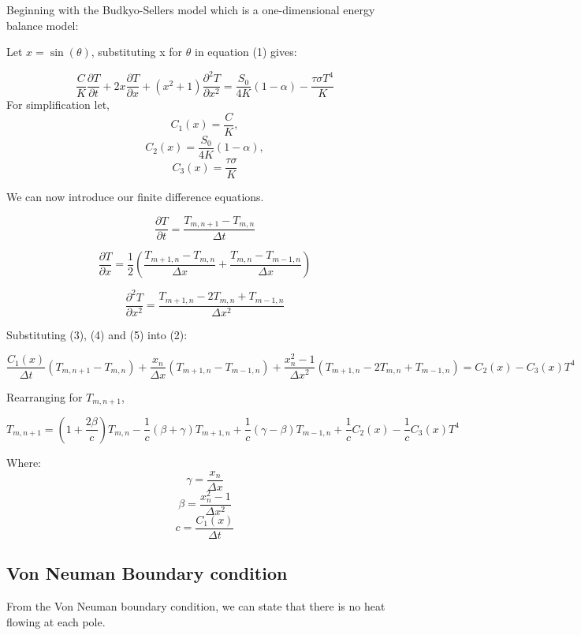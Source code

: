 \documentclass{article}%
\begin{document}
Beginning with the Budkyo-Sellers model which is a one-dimensional energy balance model:

Let $ x = \sin(\theta)$, substituting x for $\theta$ in equation (1) gives:

\begin{equation}
  \frac{C}{K} \frac{\partial T}{\partial t} + 2x \frac{\partial T}{\partial x} + (x^2 + 1)\frac{\partial^2 T}{\partial x^2} = \frac{S_{0}}{4K}(1 - \alpha) - \frac{\tau \sigma T^4}{K} 
\end{equation}
For simplification let, 
$$
  C_{1}(x) = \frac{C}{K},
$$
$$
  C_{2}(x) = \frac{S_{0}}{4K}(1 - \alpha),
$$
$$
  C_{3}(x) = \frac{\tau \sigma}{K}  
$$

We can now introduce our finite difference equations. 

\begin{equation}
  \frac{\partial T}{\partial t} = \frac{T_{m, n +1} - T_{m, n}}{\Delta t}
\end{equation}

\begin{equation}
  \frac{\partial T}{\partial x} = \frac{1}{2}( \frac{T_{m+1, n} - T_{m,n}}{\Delta x} + \frac{T_{m, n} - T_{m-1, n}}{\Delta x})
\end{equation}

\begin{equation}
  \frac{\partial^2 T}{\partial x^2} = \frac{T_{m+1, n} - 2T_{m,n} + T_{m-1, n}}{\Delta x^2}
\end{equation}

Substituting (3), (4) and (5) into (2):

$$
  \frac{C_{1}(x)}{\Delta t}  (T_{m, n +1} - T_{m, n}) + \frac{x_{n}}{\Delta x}(T_{m+1, n} - T_{m-1, n}) + \frac{x_{n}^{2} - 1}{\Delta x^2}(T_{m+1, n} - 2T_{m,n} + T_{m-1, n}) = C_{2}(x) - C_{3}(x) T^4
$$

Rearranging for $T_{m,n+1}$,

\begin{equation}
  T_{m, n +1} =  (1 + \frac{2\beta}{c})T_{m, n} - \frac{1}{c}({\beta + \gamma})T_{m+1, n} + \frac{1}{c}(\gamma - \beta)T_{m-1, n} + \frac{1}{c}C_{2}(x) - \frac{1}{c}C_{3}(x) T^4
\end{equation}

Where:
 $$\gamma = \frac{x_{n}}{\Delta x}$$ $$\beta = \frac{x_{n}^2 - 1}{\Delta x^2}$$ $$c = \frac{C_{1}(x)}{\Delta t}$$
\subsection{Von Neuman Boundary condition}
From the Von Neuman boundary condition, we can state that there is no heat flowing at each pole. 
\end{document}
